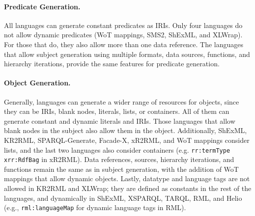 \noindent\paragraph{\textbf{Predicate Generation.}} All languages can generate constant predicates as IRIs. Only four languages do not allow dynamic predicates (WoT mappings, SMS2, ShExML, and XLWrap). For those that do, they also allow more than one data reference. The languages that allow subject generation using multiple formats, data sources, functions, and hierarchy iterations, provide the same features for predicate generation.

\noindent\paragraph{\textbf{Object Generation.}} %
Generally, languages can generate a wider range of resources for objects, since they can be IRIs, blank nodes, literals, lists, or containers. All of them can generate constant and dynamic literals and IRIs. Those languages that allow blank nodes in the subject also allow them in the object. Additionally, ShExML, KR2RML, SPARQL-Generate, Facade-X, xR2RML, and WoT mappings consider lists, and the last two languages also consider containers (e.g. \texttt{rr:termType xrr:RdfBag} in xR2RML). Data references, sources, hierarchy iterations, and functions remain the same as in subject generation, with the addition of WoT mappings that allow dynamic objects. Lastly, datatype and language tags are not allowed in KR2RML and XLWrap; they are defined as constants in the rest of the languages, and dynamically in ShExML, XSPARQL, TARQL, RML, and Helio (e.g., \texttt{rml:languageMap} for dynamic language tags in RML).

%

